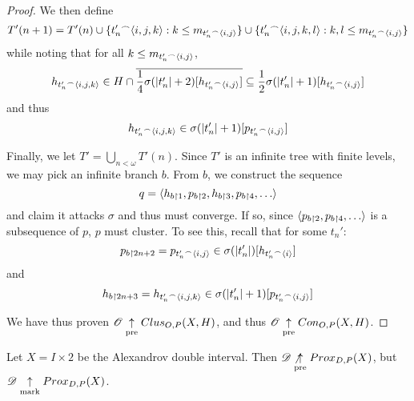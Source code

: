 \begin{proof}
  We then define 
  \[
    T'(n+1)
      =
    T'(n)
      \cup
    \{t_n'{^\frown}\langle i,j,k\rangle: k\leq m_{t_n'{^\frown}\langle i,j\rangle}\}
      \cup
    \{t_n'{^\frown}\langle i,j,k,l\rangle: k,l\leq m_{t_n'{^\frown}\langle i,j\rangle}\}
  \]
  while noting that for all $k\leq m_{t_n'{^\frown}\langle i,j\rangle}$,
  \[
    h_{t_n'{^\frown}\langle i,j,k\rangle}
      \in 
    H\cap \overline{\frac{1}{4}\sigma(|t_n'|+2)[h_{t_n'{^\frown}\langle i,j\rangle}]}
      \subseteq 
    \frac{1}{2}\sigma(|t_n'|+1)[h_{t_n'{^\frown}\langle i,j\rangle}]
  \]
  and thus
  \[
    h_{t_n'{^\frown}\langle i,j,k\rangle}\in\sigma(|t_n'|+1)[p_{t_n'{^\frown}\langle i,j\rangle}]
  \]

  Finally, we let $T'=\bigcup_{n<\omega}T'(n)$. Since 
  $T'$ is an infinite tree with finite levels, we may
  pick an infinite branch $b$. From $b$, we construct the sequence
  \[
    q=\<h_{b\rest 1}, p_{b\rest 2}, h_{b\rest 3}, p_{b\rest 4}, \dots\>
  \]
  and claim it attacks $\sigma$ and thus must converge. If so, since 
  $\<p_{b\rest2},p_{b\rest4},\dots\>$ is a subsequence of $p$, $p$ must
  cluster. To see this, recall that for some $t_n'$:
  \[
    p_{b\restriction2n+2} 
      =
    p_{t_n'{^\frown}\langle i,j\rangle}
      \in
    \sigma(|t_n'|)[h_{t_n'{^\frown}\langle i\rangle}]
  \]
  and
  \[
    h_{b\restriction2n+3}
      =
    h_{t_n'{^\frown}\langle i,j,k\rangle}
      \in
    \sigma(|t_n'|+1)[p_{t_n'{^\frown}\langle i,j\rangle}]
  \]

  We have thus proven $\mathscr{O}\underset{\text{pre}}{\uparrow}Clus_{O,P}(X,H)$, and thus
  $\mathscr{O}\underset{\text{pre}}{\uparrow}Con_{O,P}(X,H)$.
\end{proof}











\newpage

\begin{example}
  Let $X=I\times 2$ be the Alexandrov double interval. Then 
  $\mathscr{D} \not\underset{\text{pre}}{\uparrow} Prox_{D,P}(X)$, but $\mathscr{D} \underset{\text{mark}}{\uparrow} Prox_{D,P}(X)$.
\end{example}


